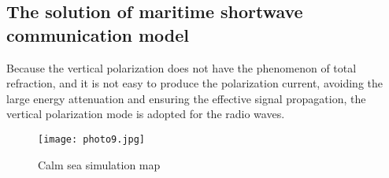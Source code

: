 \documentclass{mcmthesis}
\begin{document}
\subsection{The solution of maritime shortwave communication model}%
Because the vertical polarization does not have the phenomenon of total refraction, and it is not easy to produce the polarization current, avoiding the large energy attenuation and ensuring the effective signal propagation, the vertical polarization mode is adopted for the radio waves.
\begin{figure}[h]
\small
\centering
\texttt{[image: photo9.jpg]}
\caption{Calm sea simulation map} \label{fig:aa}
\end{figure}
\end{document}

